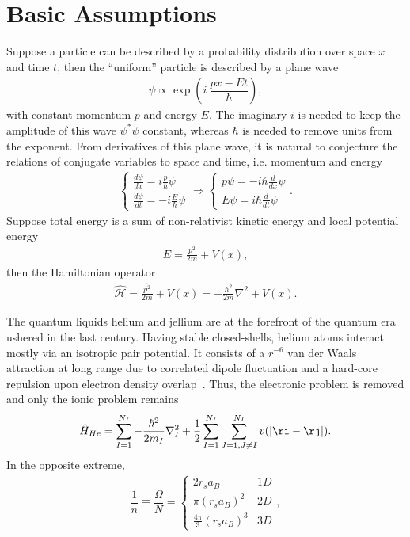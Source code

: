 \section{Basic Assumptions}
Suppose a particle can be described by a probability distribution over space $x$ and time $t$, then the ``uniform'' particle is described by a plane wave
\begin{align}
\psi \propto \exp\left(
i~\dfrac{px-Et}{\hbar}
\right),
\end{align}
with constant momentum $p$ and energy $E$. The imaginary $i$ is needed to keep the amplitude of this wave $\psi^*\psi$ constant, whereas $\hbar$ is needed to remove units from the exponent. From derivatives of this plane wave, it is natural to conjecture the relations of conjugate variables to space and time, i.e. momentum and energy
\begin{align}
\left\{
\begin{array}{l}
\frac{d\psi}{dx} =  i\frac{p}{\hbar}\psi \\ [8 pt]
\frac{d\psi}{dt} = -i\frac{E}{\hbar}\psi
\end{array}
\right. \Rightarrow
\left\{
\begin{array}{l}
p\psi = -i\hbar\frac{d}{dx} \psi \\ [8 pt]
E\psi =  i\hbar\frac{d}{dt} \psi
\end{array}
\right..
\end{align}
Suppose total energy is a sum of non-relativist kinetic energy and local potential energy
\begin{align}
E = \frac{p^2}{2m} + V(x),
\end{align}
then the Hamiltonian operator
\begin{align}
\hat{\mathcal{H}} = \frac{\hat{p^2}}{2m} + V(x) = -\frac{\hbar^2}{2m}\nabla^2 + V(x).
\end{align}

The quantum liquids helium and jellium are at the forefront of the quantum era ushered in the last century.
Having stable closed-shells, helium atoms interact mostly via an isotropic pair potential. It consists of a $r^{-6}$ van der Waals attraction at long range due to correlated dipole fluctuation and a hard-core repulsion upon electron density overlap~\cite{Aziz1979}.
Thus, the electronic problem is removed and only the ionic problem remains
\begin{align}
\hat{H}_{He} = \sum\limits_{I=1}^{N_I} -\dfrac{\hbar^2}{2m_I}\nabla_I^2
+\frac{1}{2}\sum\limits_{I=1}^{N_I}\sum\limits_{J=1,J\neq I}^{N_I} v(\vert\ri-\rj\vert).
\end{align}
In the opposite extreme, 
\begin{align}
\dfrac{1}{n} \equiv \dfrac{\Omega}{N} = \left\{\begin{array}{lr}
2 r_s a_B & 1D\\
\pi(r_sa_B)^2 & 2D\\
\frac{4\pi}{3}(r_sa_B)^3 & 3D
\end{array}\right.,
\end{align}

